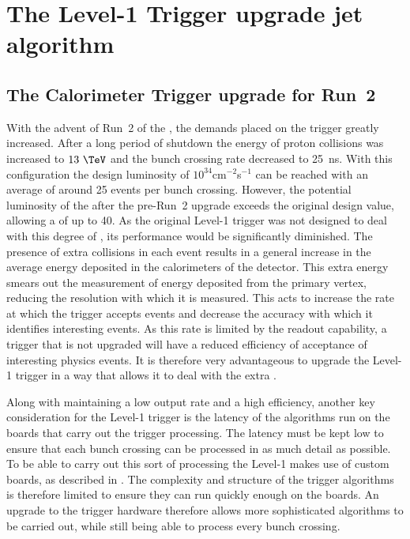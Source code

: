 \chapter{The Level-1 Trigger upgrade jet algorithm}
\label{chap:l1trig}

\section{The Calorimeter Trigger upgrade for Run~2}
\label{sec:trigUpgrade}

With the advent of Run~2 of the \LHC, the demands placed on the \CMS
trigger greatly increased. After a long period of shutdown the energy
of proton collisions was increased to $13~\tev$ and the bunch crossing
rate decreased to 25~ns. With this configuration the design luminosity
of $10^{34}$cm$^{-2}$s$^{-1}$ can be reached with an average \PU of
around 25 events per bunch crossing. However, the potential luminosity
of the \LHC after the pre-Run~2 upgrade exceeds the original design
value, allowing a \PU of up to 40. As the original Level-1 trigger was
not designed to deal with this degree of \PU, its performance would be
significantly diminished. The presence of extra collisions in each
event results in a general increase in the average energy deposited in
the calorimeters of the detector. This extra energy smears out the
measurement of energy deposited from the primary vertex, reducing the resolution with
which it is measured. This acts to increase the rate at which the
trigger accepts events and decrease the accuracy with which it
identifies interesting events. As this rate is limited by the readout
capability, a trigger that is not upgraded will have a reduced
efficiency of acceptance of interesting physics events.  It is
therefore very advantageous to upgrade the Level-1 trigger in a way
that allows it to deal with the extra \PU.

Along with maintaining a low output rate and a high efficiency,
another key consideration for the Level-1 trigger is the latency of
the algorithms run on the boards that carry out the trigger
processing. The latency must be kept low to ensure that each bunch
crossing can be processed in as much detail as possible. To be able to
carry out this sort of processing the Level-1 makes use of custom
\FPGA boards, as described in . The complexity and structure of the
trigger algorithms is therefore limited to ensure they can run quickly
enough on the \FPGA boards. An upgrade to the trigger hardware
therefore allows more sophisticated algorithms to be carried out,
while still being able to process every bunch crossing.

